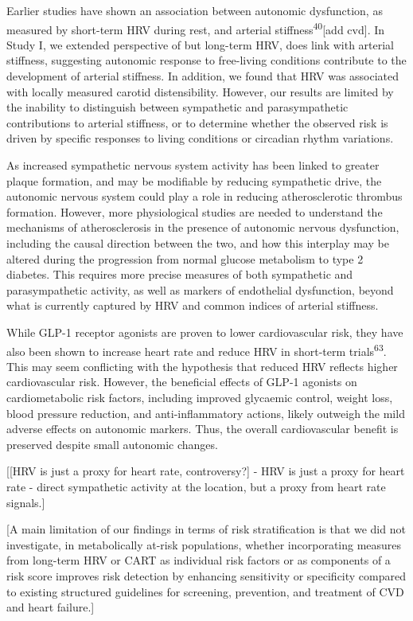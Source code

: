 \documentclass[
  a4paper,
  headsepline=true,
  open=any]{scrbook}
\begin{document}
Earlier studies have shown an association between autonomic dysfunction,
as measured by short-term HRV during rest, and arterial
stiffness\textsuperscript{40}{[}add cvd{]}. In Study I, we extended
perspective of but long-term HRV, does link with arterial stiffness,
suggesting autonomic response to free-living conditions contribute to
the development of arterial stiffness. In addition, we found that HRV
was associated with locally measured carotid distensibility. However,
our results are limited by the inability to distinguish between
sympathetic and parasympathetic contributions to arterial stiffness, or
to determine whether the observed risk is driven by specific responses
to living conditions or circadian rhythm variations.

As increased sympathetic nervous system activity has been linked to
greater plaque formation, and may be modifiable by reducing sympathetic
drive, the autonomic nervous system could play a role in reducing
atherosclerotic thrombus formation. However, more physiological studies
are needed to understand the mechanisms of atherosclerosis in the
presence of autonomic nervous dysfunction, including the causal
direction between the two, and how this interplay may be altered during
the progression from normal glucose metabolism to type 2 diabetes. This
requires more precise measures of both sympathetic and parasympathetic
activity, as well as markers of endothelial dysfunction, beyond what is
currently captured by HRV and common indices of arterial stiffness.

While GLP-1 receptor agonists are proven to lower cardiovascular risk,
they have also been shown to increase heart rate and reduce HRV in
short-term trials\textsuperscript{63}. This may seem conflicting with
the hypothesis that reduced HRV reflects higher cardiovascular risk.
However, the beneficial effects of GLP-1 agonists on cardiometabolic
risk factors, including improved glycaemic control, weight loss, blood
pressure reduction, and anti-inflammatory actions, likely outweigh the
mild adverse effects on autonomic markers. Thus, the overall
cardiovascular benefit is preserved despite small autonomic changes.

{[}{[}HRV is just a proxy for heart rate, controversy?{]} - HRV is just
a proxy for heart rate - direct sympathetic activity at the location,
but a proxy from heart rate signals.{]}

{[}A main limitation of our findings in terms of risk stratification is
that we did not investigate, in metabolically at-risk populations,
whether incorporating measures from long-term HRV or CART as individual
risk factors or as components of a risk score improves risk detection by
enhancing sensitivity or specificity compared to existing structured
guidelines for screening, prevention, and treatment of CVD and heart
failure.{]}
\end{document}
